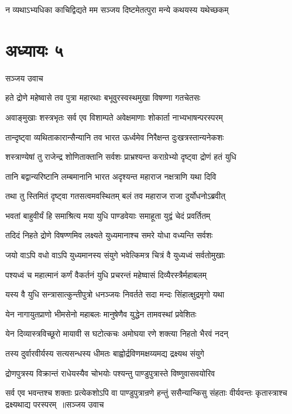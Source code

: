 \twolineshloka
{न व्यथाऽभ्यधिका काचिद्विद्यते मम सञ्जय}
{दिष्टमेतत्पुरा मन्ये कथयस्य यथेच्छकम्}


\chapter{अध्यायः ५}
\twolineshloka
{सञ्जय उवाच}
{}


\twolineshloka
{हते द्रोणे महेष्वासे तव पुत्रा महारथाः}
{बभूवुरस्वस्थमुखा विषण्णा गतचेतसः}


\twolineshloka
{अवाङ्मुखाः शस्त्रभृतः सर्व एव विशाम्पते}
{अवेक्षमाणाः शोकार्ता नाभ्यभाषन्परस्परम्}


\twolineshloka
{तान्दृष्ट्वा व्यथिताकारान्सैन्यानि तव भारत}
{ऊर्ध्वमेव निरैक्षन्त दुःखत्रस्तान्यनेकशः}


\twolineshloka
{शस्त्राण्येषां तु राजेन्द्र शोणिताक्तानि सर्वशः}
{प्राभ्रश्यन्त कराग्रेभ्यो दृष्ट्वा द्रोणं हतं युधि}


\twolineshloka
{तानि बद्वान्यरिष्टानि लम्बमानानि भारत}
{अदृश्यन्त महाराज नक्षत्राणि यथा दिवि}


\twolineshloka
{तथा तु स्तिमितं दृष्ट्वा गतसत्वमवस्थितम्}
{बलं तव महाराज राजा दुर्योधनोऽब्रवीत्}


\twolineshloka
{भवतां बाहुवीर्यं हि समाश्रित्य मया युधि}
{पाण्डवेयाः समाहूता युद्वं चेदं प्रवर्तितम्}


\twolineshloka
{तदिदं निहते द्रोणे विषण्णमिव लक्ष्यते}
{युध्यमानाश्च समरे योधा वध्यन्ति सर्वशः}


\twolineshloka
{जयो वाऽपि वधो वाऽपि युध्यमानस्य संयुगे}
{भवेत्किमत्र चित्रं वै युध्यध्वं सर्वतोमुखाः}


\twolineshloka
{पश्यध्वं च महात्मानं कर्णं वैकर्तनं युधि}
{प्रचरन्तं महेष्वासं दिव्यैरस्त्रैर्महाबलम्}


\twolineshloka
{यस्य वै युधि सन्त्रासात्कुन्तीपुत्रो धनञ्जयः}
{निवर्तते सदा मन्दः सिंहात्क्षुद्रमृगो यथा}


\twolineshloka
{येन नागायुतप्राणो भीमसेनो महाबलः}
{मानुषेणैव युद्धेन तामवस्थां प्रवेशितः}


\twolineshloka
{येन दिव्यास्त्रविच्छूरो मायावी स घटोत्कचः}
{अमोघया रणे शक्त्या निहतो भैरवं नदन्}


\twolineshloka
{तस्य दुर्वारवीर्यस्य सत्यसन्धस्य धीमतः}
{बाह्वोर्द्रविणमक्षय्यमद्य द्रक्ष्यथ संयुगे}


\twolineshloka
{द्रोणपुत्रस्य विक्रान्तं राधेयस्यैव चोभयोः}
{पश्यन्तु पाण्डुपुत्रास्ते विष्णुवासवयोरिव}


\fourlineindentedshloka
{सर्व एव भवन्तश्च शक्ताः प्रत्येकशोऽपि वा}
{पाण्डुपुत्रान्रणे हन्तुं ससैन्यान्किसु संहताः}
{वीर्यवन्तः कृतास्त्राश्च द्रक्ष्यथाद्य परस्परम् ॥सञ्जय उवाच}
{}


